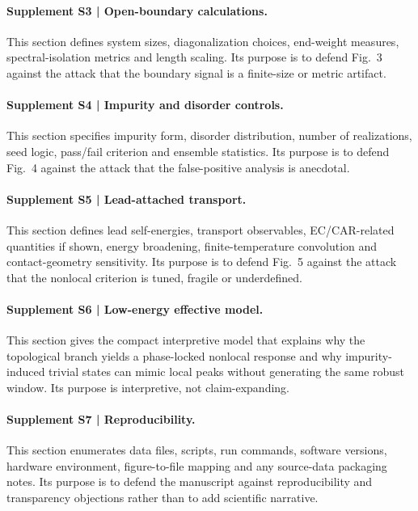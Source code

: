 \paragraph{Supplement S3 | Open-boundary calculations.}
This section defines system sizes, diagonalization choices, end-weight measures, spectral-isolation metrics and length scaling. Its purpose is to defend Fig.~3 against the attack that the boundary signal is a finite-size or metric artifact.

\paragraph{Supplement S4 | Impurity and disorder controls.}
This section specifies impurity form, disorder distribution, number of realizations, seed logic, pass/fail criterion and ensemble statistics. Its purpose is to defend Fig.~4 against the attack that the false-positive analysis is anecdotal.

\paragraph{Supplement S5 | Lead-attached transport.}
This section defines lead self-energies, transport observables, EC/CAR-related quantities if shown, energy broadening, finite-temperature convolution and contact-geometry sensitivity. Its purpose is to defend Fig.~5 against the attack that the nonlocal criterion is tuned, fragile or underdefined.

\paragraph{Supplement S6 | Low-energy effective model.}
This section gives the compact interpretive model that explains why the topological branch yields a phase-locked nonlocal response and why impurity-induced trivial states can mimic local peaks without generating the same robust window. Its purpose is interpretive, not claim-expanding.

\paragraph{Supplement S7 | Reproducibility.}
This section enumerates data files, scripts, run commands, software versions, hardware environment, figure-to-file mapping and any source-data packaging notes. Its purpose is to defend the manuscript against reproducibility and transparency objections rather than to add scientific narrative.

